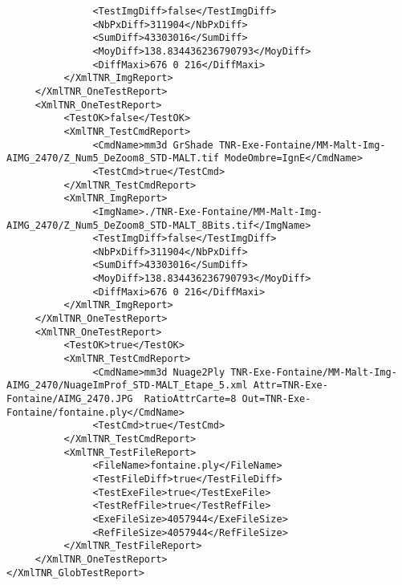\documentclass[a4paper]{book}
\begin{document}
\begin{lstlisting}
               <TestImgDiff>false</TestImgDiff>
               <NbPxDiff>311904</NbPxDiff>
               <SumDiff>43303016</SumDiff>
               <MoyDiff>138.834436236790793</MoyDiff>
               <DiffMaxi>676 0 216</DiffMaxi>
          </XmlTNR_ImgReport>
     </XmlTNR_OneTestReport>
     <XmlTNR_OneTestReport>
          <TestOK>false</TestOK>
          <XmlTNR_TestCmdReport>
               <CmdName>mm3d GrShade TNR-Exe-Fontaine/MM-Malt-Img-AIMG_2470/Z_Num5_DeZoom8_STD-MALT.tif ModeOmbre=IgnE</CmdName>
               <TestCmd>true</TestCmd>
          </XmlTNR_TestCmdReport>
          <XmlTNR_ImgReport>
               <ImgName>./TNR-Exe-Fontaine/MM-Malt-Img-AIMG_2470/Z_Num5_DeZoom8_STD-MALT_8Bits.tif</ImgName>
               <TestImgDiff>false</TestImgDiff>
               <NbPxDiff>311904</NbPxDiff>
               <SumDiff>43303016</SumDiff>
               <MoyDiff>138.834436236790793</MoyDiff>
               <DiffMaxi>676 0 216</DiffMaxi>
          </XmlTNR_ImgReport>
     </XmlTNR_OneTestReport>
     <XmlTNR_OneTestReport>
          <TestOK>true</TestOK>
          <XmlTNR_TestCmdReport>
               <CmdName>mm3d Nuage2Ply TNR-Exe-Fontaine/MM-Malt-Img-AIMG_2470/NuageImProf_STD-MALT_Etape_5.xml Attr=TNR-Exe-Fontaine/AIMG_2470.JPG  RatioAttrCarte=8 Out=TNR-Exe-Fontaine/fontaine.ply</CmdName>
               <TestCmd>true</TestCmd>
          </XmlTNR_TestCmdReport>
          <XmlTNR_TestFileReport>
               <FileName>fontaine.ply</FileName>
               <TestFileDiff>true</TestFileDiff>
               <TestExeFile>true</TestExeFile>
               <TestRefFile>true</TestRefFile>
               <ExeFileSize>4057944</ExeFileSize>
               <RefFileSize>4057944</RefFileSize>
          </XmlTNR_TestFileReport>
     </XmlTNR_OneTestReport>
</XmlTNR_GlobTestReport>

\end{lstlisting}
\end{document}
